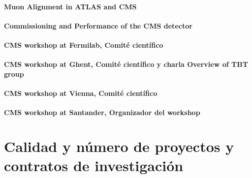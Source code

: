 \documentclass[a4paper, 11pt, twoside, openright]{report}
\begin{document}
\paragraph{Muon Alignment in ATLAS and CMS}


\paragraph{Commissioning and Performance of the CMS detector}


\paragraph{CMS workshop at Fermilab, Comité científico}


\paragraph{CMS workshop at Ghent, Comité científico y charla Overview of TBT group}


\paragraph{CMS workshop at Vienna, Comité científico}


\paragraph{CMS workshop at Santander, Organizador del workshop}




\section{Calidad y número de proyectos y contratos de investigación}
\end{document}
